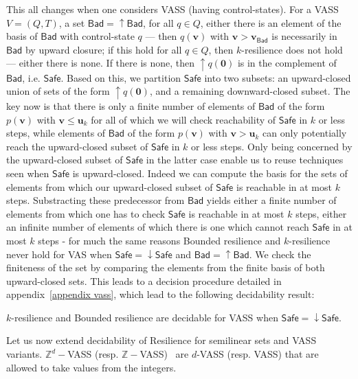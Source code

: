 \documentclass[runningheads]{llncs}
\newcommand{\Bad}{\textsf{Bad}}
\newcommand{\Safe}{\textsf{Safe}}
\begin{document}
This all changes when one considers VASS (having control-states). For a VASS $V = (Q,T)$, a set $\Bad = \mathop{\uparrow} \Bad$, for all $q \in Q$, either there is an element of the basis of $\Bad$ with control-state $q$ \----
then $q(\textbf{v})$ with $\textbf{v} > \textbf{v}_{\Bad}$ is necessarily in $\Bad$ by upward closure; if this hold for all $q \in Q$, then $k$-resilience does not hold \---- either there is none. If there is none, then 
$\mathop{\uparrow} q(\textbf{0})$
 is in the complement of $\Bad$, i.e. $\Safe$.
Based on this, we partition $\Safe$ into two subsets: an upward-closed 
union of sets of the form $\mathop{\uparrow} q(\textbf{0})$, and a remaining downward-closed subset.
The key now is that
there is only a finite number of elements of $\Bad$ of the form $p(\textbf{v})$ with $ \textbf{v} \leq \textbf{u}_k$ for all of which we will check reachability of $\Safe$ in $k$ or less steps, while 
 elements of $\Bad$ of the form $p(\textbf{v})$ with $ \textbf{v} > \textbf{u}_k$ can only potentially reach the upward-closed subset of $\Safe$ in $k$ or less steps. 
Only being concerned by the upward-closed subset of $\Safe$ in the latter case enable us to reuse techniques seen when $\Safe$ is upward-closed. Indeed we can compute the basis for the sets of elements from which our upward-closed subset of $\Safe$ is reachable in at most $k$ steps. 
Substracting these predecessor from $\Bad$ yields either a finite number of elements from which one has to check $\Safe$ is reachable in at most $k$ steps, either an infinite number of elements of which there is one which cannot reach $\Safe$ in at most $k$ steps \-- for much the same reasons {\sc Bounded resilience} and {\sc $k$-resilience} never hold for VAS when $\Safe = \mathop{\downarrow} \Safe$ and $\Bad = \mathop{\uparrow} \Bad$.
We check the finiteness of the set by comparing the elements from the finite basis of both upward-closed sets. This leads to a decision procedure detailed in appendix~\ref{appendix vass},
 which lead to the following decidability result:
\begin{theorem}\label{vass down}
{\sc $k$-resilience }  and {\sc Bounded resilience} are decidable for VASS when 
$\Safe = \mathop{\downarrow} \Safe$.
\end{theorem}



Let us now extend decidability of {\sc Resilience} for semilinear sets and VASS variants.
%
$\mathbb{Z}^d-$VASS (resp. $\mathbb{Z}-$VASS)~\cite{DBLP:conf/rp/HaaseH14} are $d$-VASS (resp. VASS) that are allowed to take values from the integers.
\end{document}

